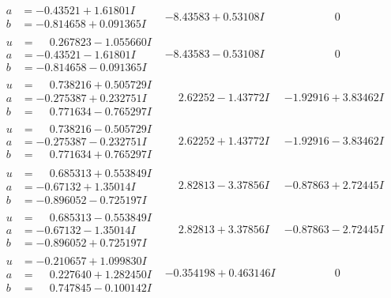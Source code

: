 \documentclass[1p]{elsarticle_modified}
\theoremstyle{definition}
\begin{document}
$$\begin{array}{c|c|c}
\begin{aligned}
a &= -0.43521 + 1.61801 I \\
b &= -0.814658 + 0.091365 I\end{aligned}
 & -8.43583 + 0.53108 I & \phantom{-0.000000 } 0 \\ \hline\begin{aligned}
u &= \phantom{-}0.267823 - 1.055660 I \\
a &= -0.43521 - 1.61801 I \\
b &= -0.814658 - 0.091365 I\end{aligned}
 & -8.43583 - 0.53108 I & \phantom{-0.000000 } 0 \\ \hline\begin{aligned}
u &= \phantom{-}0.738216 + 0.505729 I \\
a &= -0.275387 + 0.232751 I \\
b &= \phantom{-}0.771634 - 0.765297 I\end{aligned}
 & \phantom{-}2.62252 - 1.43772 I & -1.92916 + 3.83462 I \\ \hline\begin{aligned}
u &= \phantom{-}0.738216 - 0.505729 I \\
a &= -0.275387 - 0.232751 I \\
b &= \phantom{-}0.771634 + 0.765297 I\end{aligned}
 & \phantom{-}2.62252 + 1.43772 I & -1.92916 - 3.83462 I \\ \hline\begin{aligned}
u &= \phantom{-}0.685313 + 0.553849 I \\
a &= -0.67132 + 1.35014 I \\
b &= -0.896052 - 0.725197 I\end{aligned}
 & \phantom{-}2.82813 - 3.37856 I & -0.87863 + 2.72445 I \\ \hline\begin{aligned}
u &= \phantom{-}0.685313 - 0.553849 I \\
a &= -0.67132 - 1.35014 I \\
b &= -0.896052 + 0.725197 I\end{aligned}
 & \phantom{-}2.82813 + 3.37856 I & -0.87863 - 2.72445 I \\ \hline\begin{aligned}
u &= -0.210657 + 1.099830 I \\
a &= \phantom{-}0.227640 + 1.282450 I \\
b &= \phantom{-}0.747845 - 0.100142 I\end{aligned}
 & -0.354198 + 0.463146 I & \phantom{-0.000000 } 0 \\ \hline\begin{aligned}

\end{aligned}
\end{array}$$
\end{document}
